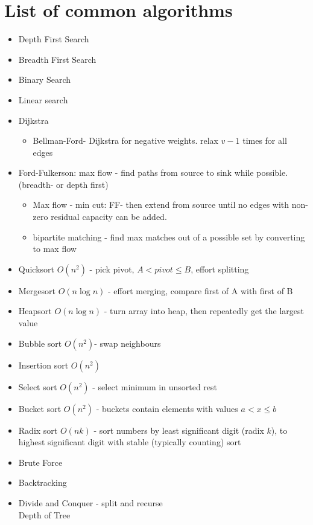 \documentclass[10pt,hidelinks]{article}
\begin{document}


\section{List of common algorithms}
\begin{itemize}
\item Depth First Search
\item Breadth First Search
\item Binary Search
\item Linear search
\item Dijkstra
\begin{itemize}
\item Bellman-Ford- Dijkstra for negative weights. relax $v-1$ times for all edges
\end{itemize}
\item Ford-Fulkerson: max flow - find paths from source to sink while possible. (breadth- or depth first)
\begin{itemize}
\item Max flow - min cut: FF- then extend from source until no edges with non-zero residual capacity can be added.
\item bipartite matching - find max matches out of a possible set by converting to max flow
\end{itemize}
\item Quicksort $O(n^2)$ - pick pivot, $A<pivot \leq B$, effort splitting
\item Mergesort $O(n \log n)$ - effort merging, compare first of A with first of B
\item Heapsort $O(n \log n)$ - turn array into heap, then repeatedly get the largest value
\item Bubble sort $O(n^2)$- swap neighbours
\item Insertion sort $O(n^2)$
\item Select sort $O(n^2)$ - select minimum in unsorted rest
\item Bucket sort $O(n^2)$ - buckets contain elements with values $a < x \leq b$
\item Radix sort $O(nk)$ - sort numbers by least significant digit (radix $k$), to highest significant digit with stable (typically counting) sort
\item Brute Force
\item Backtracking
\item Divide and Conquer - split and recurse \\
	Depth of Tree

\end{itemize}
\end{document}
